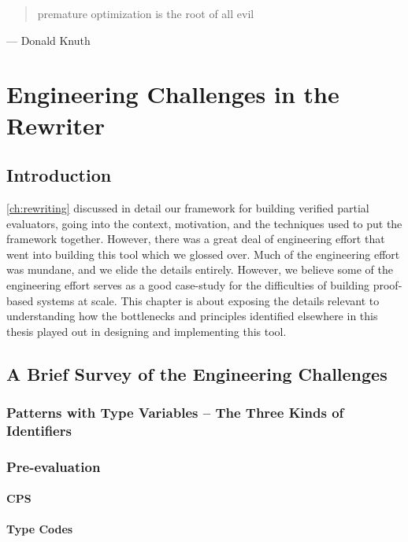 \begin{quote}
  premature optimization is the root of all evil
\end{quote}
\begin{flushright}
  --- Donald Knuth
\end{flushright}

\chapter{Engineering Challenges in the Rewriter} \label{ch:rewriting-more}
\section{Introduction} \label{sec:rewriting-more:intro}
\autoref{ch:rewriting} discussed in detail our framework for building verified partial evaluators, going into the context, motivation, and the techniques used to put the framework together.
However, there was a great deal of engineering effort that went into building this tool which we glossed over.
Much of the engineering effort was mundane, and we elide the details entirely.
However, we believe some of the engineering effort serves as a good case-study for the difficulties of building proof-based systems at scale.
This chapter is about exposing the details relevant to understanding how the bottlenecks and principles identified elsewhere in this thesis played out in designing and implementing this tool.

\section{A Brief Survey of the Engineering Challenges} \label{sec:rewriting-more:challenges-overview}
\subsection{Patterns with Type Variables -- The Three Kinds of Identifiers}
\subsection{Pre-evaluation}
\subsubsection{CPS}
\subsubsection{Type Codes}
